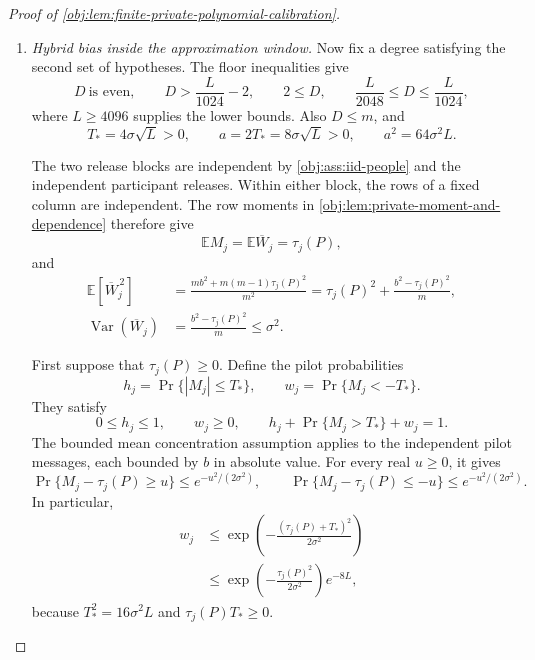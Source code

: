 \begin{proof}[Proof of \cref{obj:lem:finite-private-polynomial-calibration}]
\begin{enumerate}
For the stipulated \(H=\log(e+\sigma^2L)\), we have
\[
H\ge1,
\qquad
DH\le\frac L{1024},
\qquad D\le L,
\qquad e^H=e+\sigma^2L.
\]
Since \(8\le e^3\), these inequalities imply
\[
1+8D\sigma^2
\le8(e+\sigma^2L)
=8e^H
\le e^{4H}.
\]
Thus
\[
e^{5D}(1+8D\sigma^2)^D
\le e^{5D+4DH}
\le e^{9DH},
\]
and hence
\[
\operatorname{Var}(\widehat p_{1/2,D,j})
\le\mathbb E[\widehat p_{1/2,D,j}^{\,2}]
\le\frac14e^{9DH}.
\]
Each polynomial estimate is a deterministic measurable statistic of its own column. Applying the average-variance conclusion of \cref{obj:lem:private-moment-and-dependence}, with \(0<m\le n\), proves
\[
\operatorname{Var}\left(\frac1d\sum_{j=1}^d\widehat p_{1/2,D,j}\right)
\le\frac2d\max_{j\in[d]}
       \operatorname{Var}(\widehat p_{1/2,D,j})
\le\frac{e^{9DH}}{2d}.
\]

\item \textit{Hybrid bias inside the approximation window.}
Now fix a degree satisfying the second set of hypotheses. The floor inequalities give
\[
D\ \text{is even},
\qquad
D>\frac L{1024}-2,
\qquad
2\le D,
\qquad
\frac L{2048}\le D\le\frac L{1024},
\]
where \(L\ge4096\) supplies the lower bounds. Also \(D\le m\), and
\[
T_*=4\sigma\sqrt L>0,
\qquad
a=2T_*=8\sigma\sqrt L>0,
\qquad
a^2=64\sigma^2L.
\]

The two release blocks are independent by \cref{obj:ass:iid-people} and the independent participant releases. Within either block, the rows of a fixed column are independent. The row moments in \cref{obj:lem:private-moment-and-dependence} therefore give
\[
\mathbb EM_j=\mathbb E\overline W_j=\tau_j(P),
\]
and
\[
\begin{aligned}
\mathbb E[\overline W_j^{\,2}]
&=\frac{mb^2+m(m-1)\tau_j(P)^2}{m^2}
=\tau_j(P)^2+\frac{b^2-\tau_j(P)^2}{m},\\
\operatorname{Var}(\overline W_j)
&=\frac{b^2-\tau_j(P)^2}{m}
\le\sigma^2.
\end{aligned}
\]

First suppose that \(\tau_j(P)\ge0\). Define the pilot probabilities
\[
h_j=\Pr\{|M_j|\le T_*\},
\qquad
w_j=\Pr\{M_j<-T_*\}.
\]
They satisfy
\[
0\le h_j\le1,
\qquad w_j\ge0,
\qquad
h_j+\Pr\{M_j>T_*\}+w_j=1.
\]
The bounded mean concentration assumption applies to the independent pilot messages, each bounded by \(b\) in absolute value. For every real \(u\ge0\), it gives
\[
\Pr\{M_j-\tau_j(P)\ge u\}
\le e^{-u^2/(2\sigma^2)},
\qquad
\Pr\{M_j-\tau_j(P)\le-u\}
\le e^{-u^2/(2\sigma^2)}.
\]
In particular,
\[
\begin{aligned}
w_j
&\le\exp\!\left(-\frac{(\tau_j(P)+T_*)^2}{2\sigma^2}\right)\\
&\le\exp\!\left(-\frac{\tau_j(P)^2}{2\sigma^2}\right)e^{-8L},
\end{aligned}
\]
because \(T_*^2=16\sigma^2L\) and \(\tau_j(P)T_*\ge0\).


\end{enumerate}
\end{proof}
